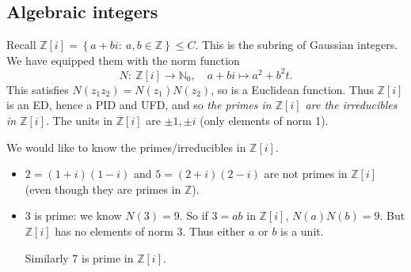 \documentclass[egregdoesnotlikesansseriftitles,a4paper]{scrartcl}
\begin{document}
\subsection{Algebraic integers}
Recall $\mathbb{Z}[i]= \left\{a+bi: \ a, b \in \mathbb{Z}\right\} \leq C$. This is the subring of Gaussian integers. We have equipped them with the norm function \[
N: \ \mathbb{Z}[i] \rightarrow \mathbb{N}_{0}, \quad a+bi \mapsto a^2+b^2t
.\] This satisfies $N (z_1 z_2 )=N (z_1 )N (z_2 )$, so is a Euclidean function. Thus $\mathbb{Z}[i]$ is an ED, hence a PID and UFD, and so \emph{the primes in $\mathbb{Z}[i]$ are the irreducibles in $\mathbb{Z}[i]$}. The units in $\mathbb{Z}[i]$ are $\pm 1, \pm i$ (only elements of norm 1). 
\begin{goal}
      We would like to know the primes/irreducibles in $\mathbb{Z}[i]$.
\end{goal}
\begin{example*}
       \begin{itemize}
             \item $2= (1+i)(1-i)$ and $5= (2+i)(2-i)$ are not primes in $\mathbb{Z}[i]$ (even though they are primes in $\mathbb{Z}$).
             \item 3 is prime: we know $N (3)=9$. So if $3=ab$ in $\mathbb{Z}[i]$, $N (a)N (b)=9$. But $\mathbb{Z}[i]$ has no elements of norm 3. Thus either $a$ or $b$ is a unit.
             
             Similarly 7 is prime in $\mathbb{Z}[i]$.
       \end{itemize}
\end{example*}
\end{document}
